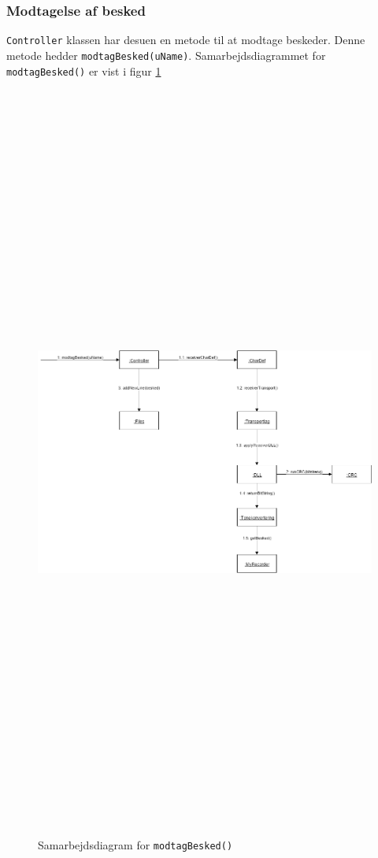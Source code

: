 \subsubsection{Modtagelse af besked}
\texttt{Controller} klassen har desuen en metode til at modtage beskeder. Denne metode hedder \texttt{modtagBesked(uName)}. Samarbejdsdiagrammet for \texttt{modtagBesked()} er vist i figur \ref{fig:sdmod}
\begin{figure}[ht]
	\centering
	\includegraphics[width=15cm,height=25cm,keepaspectratio]{pictures/SDmodtagBesked.png}
	\caption{Samarbejdsdiagram for \texttt{modtagBesked()}}
	\label{fig:sdmod}
\end{figure}
